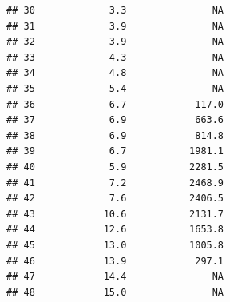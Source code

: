 \documentclass[
]{article}
\newenvironment{Shaded}{\begin{snugshade}}{\end{snugshade}}
\newcommand{\CommentTok}[1]{\textcolor[rgb]{0.56,0.35,0.01}{\textit{#1}}}
\newcommand{\FunctionTok}[1]{\textcolor[rgb]{0.13,0.29,0.53}{\textbf{#1}}}
\newcommand{\NormalTok}[1]{#1}
\newcommand{\OtherTok}[1]{\textcolor[rgb]{0.56,0.35,0.01}{#1}}
\newcommand{\SpecialCharTok}[1]{\textcolor[rgb]{0.81,0.36,0.00}{\textbf{#1}}}
\newcommand{\StringTok}[1]{\textcolor[rgb]{0.31,0.60,0.02}{#1}}
\begin{document}
\begin{verbatim}
## 30             3.3               NA
## 31             3.9               NA
## 32             3.9               NA
## 33             4.3               NA
## 34             4.8               NA
## 35             5.4               NA
## 36             6.7            117.0
## 37             6.9            663.6
## 38             6.9            814.8
## 39             6.7           1981.1
## 40             5.9           2281.5
## 41             7.2           2468.9
## 42             7.6           2406.5
## 43            10.6           2131.7
## 44            12.6           1653.8
## 45            13.0           1005.8
## 46            13.9            297.1
## 47            14.4               NA
## 48            15.0               NA
\end{verbatim}

\begin{Shaded}
\end{Shaded}
\end{document}
